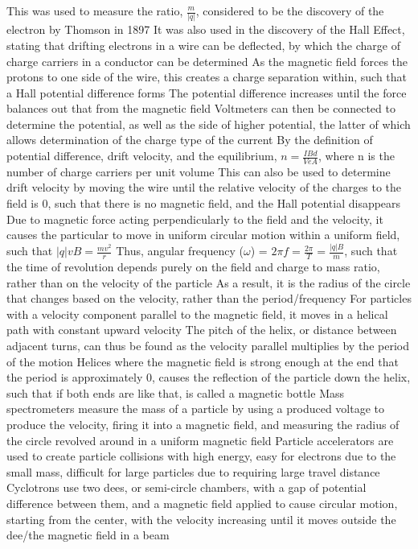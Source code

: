 \documentclass[11 pt, twoside]{article}
\newenvironment{outline*}
{
	\begin{outline}[enumerate]
	}
	{\end{outline}
}
\begin{document}
\begin{outline*}
\3 This was used to measure the ratio, $\frac{m}{|q|}$, considered to be the discovery of the electron by Thomson in 1897
\2 It was also used in the discovery of the Hall Effect, stating that drifting electrons in a wire can be deflected, by which the charge of charge carriers in a conductor can be determined
\3 As the magnetic field forces the protons to one side of the wire, this creates a charge separation within, such that a Hall potential difference forms
\4 The potential difference increases until the force balances out that from the magnetic field
\3 Voltmeters can then be connected to determine the potential, as well as the side of higher potential, the latter of which allows determination of the charge type of the current
\4 By the definition of potential difference, drift velocity, and the equilibrium, $n = \frac{IBd}{VeA}$, where n is the number of charge carriers per unit volume
\4 This can also be used to determine drift velocity by moving the wire until the relative velocity of the charges to the field is 0, such that there is no magnetic field, and the Hall potential disappears
\1 Due to magnetic force acting perpendicularly to the field and the velocity, it causes the particular to move in uniform circular motion within a uniform field, such that $|q|vB = \frac{mv^2}{r}$
\2 Thus, angular frequency ($\omega$) = $2\pi f = \frac{2\pi}{T} = \frac{|q|B}{m}$, such that the time of revolution depends purely on the field and charge to mass ratio, rather than on the velocity of the particle
\3 As a result, it is the radius of the circle that changes based on the velocity, rather than the period/frequency
\2 For particles with a velocity component parallel to the magnetic field, it moves in a helical path with constant upward velocity
\3 The pitch of the helix, or distance between adjacent turns, can thus be found as the velocity parallel multiplies by the period of the motion
\3 Helices where the magnetic field is strong enough at the end that the period is approximately 0, causes the reflection of the particle down the helix, such that if both ends are like that, is called a magnetic bottle
\2 Mass spectrometers measure the mass of a particle by using a produced voltage to produce the velocity, firing it into a magnetic field, and measuring the radius of the circle revolved around in a uniform magnetic field
\1 Particle accelerators are used to create particle collisions with high energy, easy for electrons due to the small mass, difficult for large particles due to requiring large travel distance
\2 Cyclotrons use two dees, or semi-circle chambers, with a gap of potential difference between them, and a magnetic field applied to cause circular motion, starting from the center, with the velocity increasing until it moves outside the dee/the magnetic field in a beam

\end{outline*}
\end{document}
